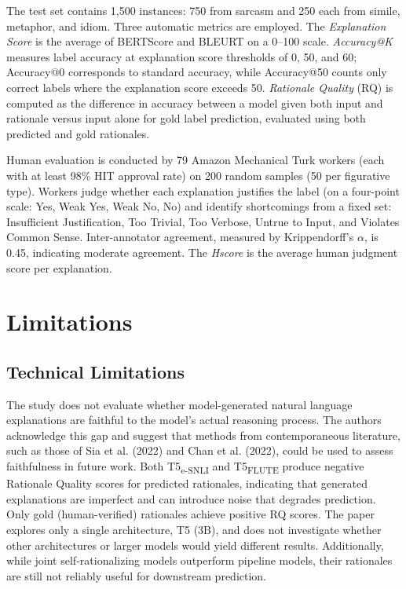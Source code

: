\documentclass[12pt]{article}
\begin{document}
The test set contains 1,500 instances: 750 from sarcasm and 250 each from simile, metaphor, and idiom. Three automatic metrics are employed. The \textit{Explanation Score} is the average of BERTScore and BLEURT on a 0--100 scale. \textit{Accuracy@K} measures label accuracy at explanation score thresholds of 0, 50, and 60; Accuracy@0 corresponds to standard accuracy, while Accuracy@50 counts only correct labels where the explanation score exceeds 50. \textit{Rationale Quality} (RQ) is computed as the difference in accuracy between a model given both input and rationale versus input alone for gold label prediction, evaluated using both predicted and gold rationales.

Human evaluation is conducted by 79 Amazon Mechanical Turk workers (each with at least 98\% HIT approval rate) on 200 random samples (50 per figurative type). Workers judge whether each explanation justifies the label (on a four-point scale: Yes, Weak Yes, Weak No, No) and identify shortcomings from a fixed set: Insufficient Justification, Too Trivial, Too Verbose, Untrue to Input, and Violates Common Sense. Inter-annotator agreement, measured by Krippendorff's $\alpha$, is 0.45, indicating moderate agreement. The \textit{Hscore} is the average human judgment score per explanation.

\section{Limitations}

\subsection{Technical Limitations}

The study does not evaluate whether model-generated natural language explanations are faithful to the model's actual reasoning process. The authors acknowledge this gap and suggest that methods from contemporaneous literature, such as those of Sia et al. (2022) and Chan et al. (2022), could be used to assess faithfulness in future work. Both T5\textsubscript{e-SNLI} and T5\textsubscript{FLUTE} produce negative Rationale Quality scores for predicted rationales, indicating that generated explanations are imperfect and can introduce noise that degrades prediction. Only gold (human-verified) rationales achieve positive RQ scores. The paper explores only a single architecture, T5 (3B), and does not investigate whether other architectures or larger models would yield different results. Additionally, while joint self-rationalizing models outperform pipeline models, their rationales are still not reliably useful for downstream prediction.
\end{document}
